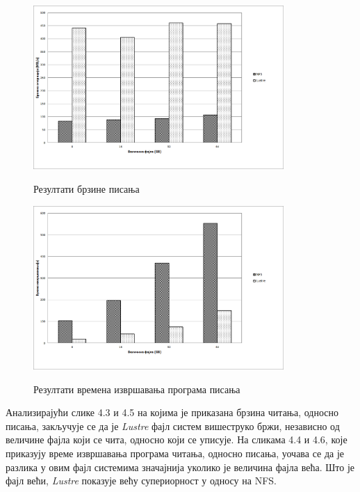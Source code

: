\begin{figure}[H]
     \centering
         \includegraphics[width=0.85\textwidth]{slike/results/dd_write_speed.png}\\[1cm]
     \caption{Резултати брзине писања}
\end{figure}   
\begin{figure}[H]
      \centering
          \includegraphics[width=0.85\textwidth]{slike/results/dd_write_time.png}\\[1cm]
      \caption{Резултати времена извршавања програма писања}
\end{figure}   
 
Анализирајући слике 4.3 и 4.5 на којима је приказана брзина читања, односно писања, закључује се да је \textit{Lustre} фајл систем вишеструко бржи, независно од величине фајла који се чита, односно који се уписује.
На сликама 4.4 и 4.6, које приказују време извршавања програма читања, односно писања, уочава се да је разлика у овим фајл системима значајнија уколико је величина фајла већа. Што је фајл већи, \textit{Lustre} показује већу супериорност у односу на NFS.

